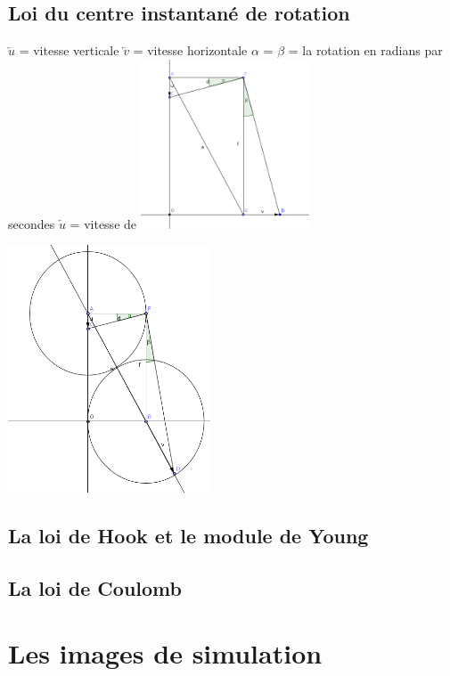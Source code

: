 \documentclass{beamer}
\begin{document}
\subsection{Loi du centre instantané de rotation}
\begin{frame}
  $\overleftarrow{u}$ = vitesse verticale
  $\overleftarrow{v}$ = vitesse horizontale
  $\alpha$ = $\beta$ = la rotation en radians par secondes
  $\overleftarrow{u}$ = vitesse de 
  \includegraphics[width=5cm]{geogebra_1.png}
\end{frame}

\begin{frame}
  \includegraphics[width=6cm]{geogebra_2.png}
\end{frame}


\subsection{La loi de Hook et le module de Young}
\begin{frame}
\end{frame}

\subsection{La loi de Coulomb}
\begin{frame}
\end{frame}

\section{Les images de simulation}
\begin{frame}
\end{frame}
\end{document}
